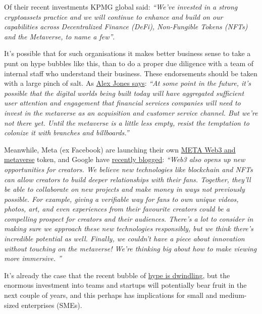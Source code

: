 \documentclass[
	12pt, %
	fleqn, %
	a4paper, %
	oneside, %
]{LegrandOrangeBook}
\begin{document}
Of their recent investments KPMG global said: \textit{``We've invested in a strong cryptoassets practice and we will continue to enhance and build on our capabilities across Decentralized Finance (DeFi), Non-Fungible Tokens (NFTs) and the Metaverse, to name a few''}.\par
It's possible that for such organisations it makes better business sense to take a punt on hype bubbles like this, than to do a proper due diligence with a team of internal staff who understand their business. These endorsements should be taken with a large pinch of salt. As \href{https://newsletter.fintechtakes.com/p/metaverse-branches?s=r}{Alex Jones says}: \textit{``At some point in the future, it’s possible that the digital worlds being built today will have aggregated sufficient user attention and engagement that financial services companies will need to invest in the metaverse as an acquisition and customer service channel. But we’re not there yet. Until the metaverse is a little less empty, resist the temptation to colonize it with branches and billboards.''}\par
Meanwhile, Meta (ex Facebook) are launching their own \href{https://metacomp.international/home/}{META Web3 and metaverse} token, and Google have \href{https://blog.youtube/inside-youtube/innovations-for-2022-at-youtube/}{recently blogged}: \textit{``Web3 also opens up new opportunities for creators. We believe new technologies like blockchain and NFTs can allow creators to build deeper relationships with their fans. Together, they'll be able to collaborate on new projects and make money in ways not previously possible. For example, giving a verifiable way for fans to own unique videos, photos, art, and even experiences from their favourite creators could be a compelling prospect for creators and their audiences. There's a lot to consider in making sure we approach these new technologies responsibly, but we think there's incredible potential as well. Finally, we couldn't have a piece about innovation without touching on the metaverse! We're thinking big about how to make viewing more immersive. ''}\par
It's already the case that the recent bubble of \href{https://www.forbes.com/sites/paultassi/2022/03/10/interest-in-nfts-and-the-metaverse-is-falling-fast/?}{hype is dwindling}, but the enormous investment into teams and startups will potentially bear fruit in the next couple of years, and this perhaps has implications for small and medium-sized enterprises (SMEs). \par
\end{document}
